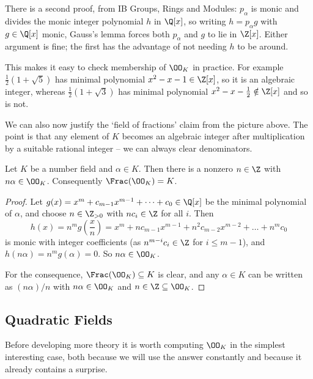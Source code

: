 \begin{remark}
	There is a second proof, from IB Groups, Rings and Modules: $p_\alpha$ is monic and divides the monic integer polynomial $h$ in $\Q[x]$, so writing $h = p_\alpha g$ with $g \in \Q[x]$ monic, Gauss's lemma forces both $p_\alpha$ and $g$ to lie in $\Z[x]$. Either argument is fine; the first has the advantage of not needing $h$ to be around.
\end{remark}

This makes it easy to check membership of $\OO_K$ in practice. For example $\tfrac{1}{2}(1 + \sqrt{5})$ has minimal polynomial $x^2 - x - 1 \in \Z[x]$, so it is an algebraic integer, whereas $\tfrac{1}{2}(1 + \sqrt{3})$ has minimal polynomial $x^2 - x - \tfrac12 \notin \Z[x]$ and so is not.

We can also now justify the `field of fractions' claim from the picture above. The point is that any element of $K$ becomes an algebraic integer after multiplication by a suitable rational integer -- we can always clear denominators.

\begin{lemma}\label{lem:clear}
	Let $K$ be a number field and $\alpha \in K$. Then there is a nonzero $n \in \Z$ with $n\alpha \in \OO_K$. Consequently $\Frac(\OO_K) = K$.
\end{lemma}

\begin{proof}
	Let $g(x) = x^m + c_{m-1}x^{m-1} + \dots + c_0 \in \Q[x]$ be the minimal polynomial of $\alpha$, and choose $n \in \Z_{>0}$ with $nc_i \in \Z$ for all $i$. Then
	$$h(x) = n^m g\!\left(\frac{x}{n}\right) = x^m + nc_{m-1}x^{m-1} + n^2c_{m-2}x^{m-2}+\dots+n^m c_0$$
	is monic with integer coefficients (as $n^{m-i}c_i \in \Z$ for $i \le m-1$), and $h(n\alpha) = n^mg(\alpha) = 0$. So $n\alpha \in \OO_K$.

	For the consequence, $\Frac(\OO_K) \subseteq K$ is clear, and any $\alpha \in K$ can be written as $(n\alpha)/n$ with $n\alpha \in \OO_K$ and $n \in \Z \subseteq \OO_K$.
\end{proof}

\subsection{Quadratic Fields}

Before developing more theory it is worth computing $\OO_K$ in the simplest interesting case, both because we will use the answer constantly and because it already contains a surprise.

